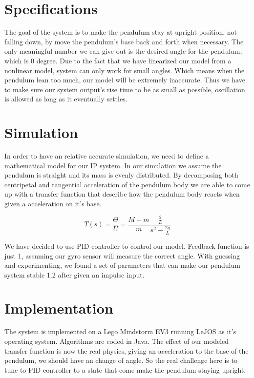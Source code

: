 \documentclass{notes}
\begin{document}

\section{Specifications}
The goal of the system is to make the pendulum stay at upright position, not falling down, by move
the pendulum's base back and forth when necessary. The only meaningful number we can give out is the
desired angle for the pendulum, which is 0 degree. Due to the fact that we have linearized our model from a
nonlinear model, system can only work for small angles. Which means when the pendulum lean too much,
our model will be extremely inaccurate. Thus we have to make sure our system output's rise time
to be as small as possible, oscillation is allowed as long as it eventually settles.


\section{Simulation}
In order to have an relative accurate simulation, we need to define a mathematical model for our
IP system. In our simulation we assume the pendulum is straight and its mass is evenly distributed.
By decomposing both centripetal and tangential acceleration of the pendulum body we are able to come
up with a transfer function that describe how the pendulum body reacts when given a acceleration on
it's base.

\[
  T(s) = \dfrac{\Theta}{U} = \dfrac{M+m}{m}\dfrac{\frac{2}{L}}{s^2-\frac{2g}{L}}
\]

We have decided to use PID controller to control our model. Feedback function is just 1, assuming
our gyro sensor will measure the correct angle. With guessing and experimenting, we found a set of
parameters that can make our pendulum system stable 1.2 after given an impulse input.

\section{Implementation}

The system is implemented on a Lego Mindstorm EV3 running LeJOS as it's operating system. Algorithms
are coded in Java. The effect of our modeled transfer function is now the real physics, giving an
acceleration to the base of the pendulum, we should have an change of angle. So the real challenge
here is to tune to PID controller to a state that come make the pendulum staying upright. 
\end{document}
